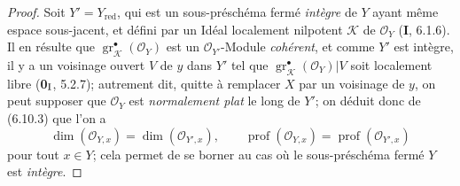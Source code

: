 \begin{proof}
Soit $Y'=Y_{\mathrm{red}}$, qui est un sous-préschéma fermé \emph{intègre} de $Y$
ayant même espace sous-jacent, et défini par un Idéal localement nilpotent
$\mathcal K$ de $\mathcal O_Y$ (\textbf{I}, 6.1.6). Il en résulte que
$\operatorname{gr}_{\mathcal K}^{\bullet}(\mathcal O_Y)$ est un
$\mathcal O_{Y'}$-Module \emph{cohérent}, et comme $Y'$ est intègre, il y a un
voisinage ouvert $V$ de $y$ dans $Y'$ tel que
$\operatorname{gr}_{\mathcal K}^{\bullet}(\mathcal O_Y)|V$ soit localement
libre (\textbf{0}$_{\rm I}$, 5.2.7); autrement dit, quitte à remplacer $X$ par un
voisinage de $y$, on peut supposer que $\mathcal O_Y$ est \emph{normalement plat}
le long de $Y'$; on déduit donc de (6.10.3) que l'on a
\[
\dim(\mathcal O_{Y,x})=\dim(\mathcal O_{Y',x}),\qquad
\operatorname{prof}(\mathcal O_{Y,x})=
\operatorname{prof}(\mathcal O_{Y',x})
\]
pour tout $x\in Y$; cela permet de se borner au cas où le sous-préschéma
fermé $Y$ est \emph{intègre}.


\end{proof}
